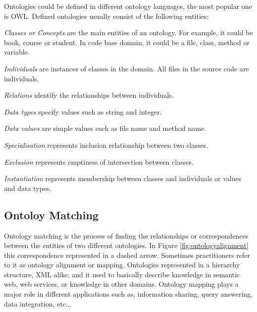 Ontologies could be defined in different ontology languages, the most popular one is OWL. Defined ontologies usually consist of the following entities:


\begin{description}
	
	\item{\textit{Classes or Concepts}} are the main entities of an ontology. For example, it could be book, course or student. In code base domain, it could be a file, class, method or variable.
	
	\item{\textit{Individuals}} are instances of classes in the domain. All files in the source code are individuals.
	
	\item{\textit{Relations}} identify the relationships between individuals.
	
	\item{\textit{Data types}} specify values such as string and integer.
	
	\item{\textit{Data values}} are simple values such as file name and method name.
	
	\item{\textit{Specialisation}} represents inclusion relationship between two classes.
	
	\item{\textit{Exclusion}} represents emptiness of intersection between classes.
	
	\item{\textit{Instantiation}} represents membership between classes and individuals or values and data types.
	
	
	
\end{description}



\subsection{Ontoloy Matching}

\label {secontologymatching}



Ontology matching is the process of finding the relationships or correspondences between the entities of two different ontologies. In Figure \ref{fig:ontologyalignment} this correspondence represented in a dashed arrow. Sometimes practitioners refer to it as ontology alignment or mapping. Ontologies represented in a hierarchy structure, XML alike, and it used to basically describe knowledge in semantic web, web services, or knowledge in other domains. Ontology mapping plays a major role in different applications such as, information sharing, query answering, data integration, etc...

